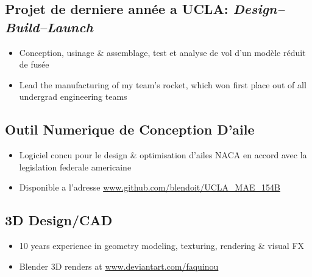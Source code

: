 \documentclass[10pt]{report}
\begin{document}
\subsection*{Projet de derniere année a UCLA: \textit{Design--Build--Launch}}
\begin{itemize}
    \item Conception, usinage \& assemblage, test et analyse de vol d'un modèle réduit de fusée
    \item Lead the manufacturing of my team's rocket, which won first place out of all undergrad engineering teams
\end{itemize}
\subsection*{Outil Numerique de Conception D'aile}
\begin{itemize}
    \item Logiciel concu pour le design \& optimisation d'ailes NACA en accord avec la legislation federale americaine
    \item  Disponible a l'adresse \url{www.github.com/blendoit/UCLA_MAE_154B}
\end{itemize}
\subsection*{3D Design/CAD}
\begin{itemize}
    \item 10 years experience in geometry modeling, texturing, rendering \& visual FX
    \item Blender 3D renders at \url{www.deviantart.com/faquinou}
\end{itemize}
\end{document}
